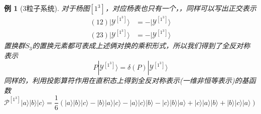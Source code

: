 \documentclass[12pt]{article}
\newtheorem{example}{例}[subsection]
\begin{document}
\begin{example}[3粒子系统]
    对于杨图$[1^3]$，对应杨表也只有一个，，同样可以写出正交表示
    \begin{equation*}
        \begin{split}
            (12)|\mathcal{Y}^{[1^3]}\rangle&=-|\mathcal{Y}^{[1^3]}\rangle\\
            (23)|\mathcal{Y}^{[1^3]}\rangle&=-|\mathcal{Y}^{[1^3]}\rangle
        \end{split}
    \end{equation*}
    置换群$S_3$的置换元素都可表成上述俩对换的乘积形式，所以我们得到了全反对称表示
    \begin{equation*}
        P|\mathcal{Y}^{[1^3]}\rangle=\delta(P)|\mathcal{Y}^{[1^3]}\rangle
    \end{equation*}
    同样的，利用投影算符作用在直积态上得到全反对称表示(一维非恒等表示)的基函数
    \begin{equation*}
        \mathcal{P}^{[1^3]}|a\rangle|b\rangle|c\rangle=\frac{1}{6}(|a\rangle|b\rangle|c\rangle-|b\rangle|a\rangle|c\rangle-|a\rangle|c\rangle|b\rangle-|c\rangle|b\rangle|a\rangle+|c\rangle|a\rangle|b\rangle+|b\rangle|c\rangle|a\rangle)
    \end{equation*}


\end{example}
\end{document}

